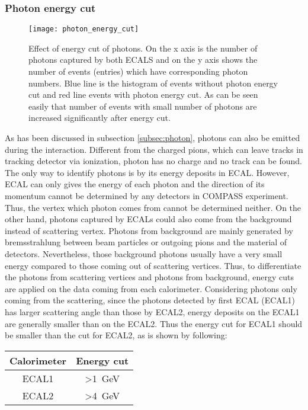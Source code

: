 \subsubsection{Photon energy cut}
\begin{figure}[!t]
	\centering
	\texttt{[image: photon\_energy\_cut]}
	\caption{Effect of energy cut of photons. On the x axis is the number of photons captured by both ECALS and on the y axis shows the number of events (entries) which have corresponding photon numbers. Blue line is the histogram of events without photon energy cut and red line events with photon energy cut. As can be seen easily that number of events with small number of photons are increased significantly after energy cut.}
	\label{fig:photon_energy_cut}
\end{figure}
As has been discussed in subsection \ref{subsec:photon}, photons can also be emitted during the interaction. Different from the charged pions, which can leave tracks in tracking detector via ionization, photon has no charge and no track can be found. The only way to identify photons is by its energy deposits in ECAL. However, ECAL can only gives the energy of each photon and the direction of its momentum cannot be determined by any detectors in COMPASS experiment. Thus, the vertex which photon comes from cannot be determined neither. On the other hand, photons captured by ECALs could also come from the background instead of scattering vertex. Photons from background are mainly generated by bremsstrahlung between beam particles or outgoing pions and the material of detectors. Nevertheless, those background photons usually have a very small energy compared to those coming out of scattering vertices. Thus, to differentiate the photons from scattering vertices and photons from background, energy cuts are applied on the data coming from each calorimeter. Considering photons only coming from the scattering, since the photons detected by first ECAL (ECAL1) has larger scattering angle than those by ECAL2, energy deposits on the ECAL1 are generally smaller than on the ECAL2. Thus the energy cut for ECAL1 should be smaller than the cut for ECAL2, as is shown by following:

\begin{center}
	\begin{tabular}{c||c}
		Calorimeter & Energy cut      \\
		\hline
		ECAL1       & \textgreater{}\SI{1}{\giga\electronvolt} \\
		\hline
		ECAL2       & \textgreater{}\SI{4}{\giga\electronvolt}
	\end{tabular}
\end{center}



